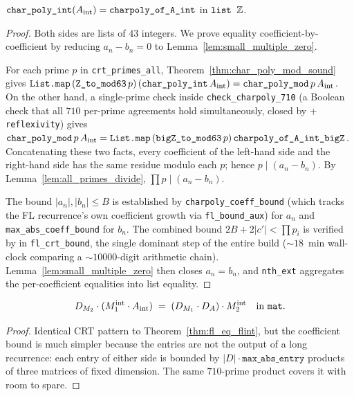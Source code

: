 \begin{theorem}
\label{thm:fl_eq_flint}
\rocqok
{}
$\texttt{char\_poly\_int}(A_{\mathrm{int}}) = \texttt{charpoly\_of\_A\_int}$
in $\texttt{list }\mathbb{Z}$.
\end{theorem}
\begin{proof}\rocqok
Both sides are lists of $43$ integers. We prove equality
coefficient-by-coefficient by reducing
$a_n - b_n = 0$ to Lemma~\ref{lem:small_multiple_zero}.

For each prime $p$ in \texttt{crt\_primes\_all},
Theorem~\ref{thm:char_poly_mod_sound} gives
$\texttt{List.map}\,(\texttt{Z\_to\_mod63}\,p)\,
   (\texttt{char\_poly\_int}\,A_{\mathrm{int}})
   = \texttt{char\_poly\_mod}\,p\,A_{\mathrm{int}}$.
On the other hand, a single-prime \vmcompute{} check inside
\texttt{check\_charpoly\_710} (a Boolean check that all $710$ per-prime
agreements hold simultaneously, closed by \vmcompute{} +
\texttt{reflexivity}) gives
$\texttt{char\_poly\_mod}\,p\,A_{\mathrm{int}}
   = \texttt{List.map}\,(\texttt{bigZ\_to\_mod63}\,p)\,
       \texttt{charpoly\_of\_A\_int\_bigZ}$.
Concatenating these two facts, every coefficient of the
left-hand side and the right-hand side has the same residue modulo
each $p$; hence $p \mid (a_n - b_n)$. By
Lemma~\ref{lem:all_primes_divide}, $\prod p \mid (a_n - b_n)$.

The bound $|a_n|, |b_n| \le B$ is established by
\texttt{charpoly\_coeff\_bound} (which tracks the FL recurrence's
own coefficient growth via \texttt{fl\_bound\_aux}) for $a_n$ and
\texttt{max\_abs\_coeff\_bound} for $b_n$. The combined bound
$2B + 2|c'| < \prod p_i$ is verified by \vmcompute{} in
\texttt{fl\_crt\_bound}, the single dominant step of the entire
build (${\sim}18$~min wall-clock comparing a ${\sim}10000$-digit
arithmetic chain). Lemma~\ref{lem:small_multiple_zero} then closes
$a_n = b_n$, and \texttt{nth\_ext} aggregates the per-coefficient
equalities into list equality.
\end{proof}

\begin{theorem}\label{thm:matrix_identity_Z}
\rocqok
{}
\[
D_{M_2} \cdot (M_1^{\mathrm{int}} \cdot A_{\mathrm{int}})
   \;=\; (D_{M_1} \cdot D_A) \cdot M_2^{\mathrm{int}}
   \quad\text{in } \texttt{mat}.
\]
\end{theorem}
\begin{proof}\rocqok
Identical CRT pattern to Theorem~\ref{thm:fl_eq_flint}, but the
coefficient bound is much simpler because the entries are not the
output of a long recurrence: each entry of either side is bounded by
$|D| \cdot \texttt{max\_abs\_entry}$ products of three matrices of
fixed dimension. The same $710$-prime product covers it with room
to spare.
\end{proof}

